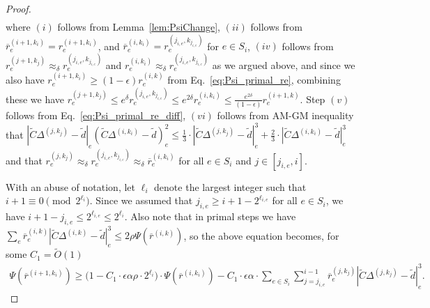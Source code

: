\documentclass[11pt]{article}
\newcommand\dd{\boldsymbol{\mathit{d}}}
\newcommand\rr{\boldsymbol{\mathit{r}}}
\newcommand\rrbar{\overline{\boldsymbol{\mathit{r}}}}
\newcommand\CC{\boldsymbol{\mathit{C}}}
\newcommand{\wt}{\widetilde}
\newcommand{\ov}{\overline}
\begin{document}
\begin{proof}
\begin{align*}
\end{align*}
where $(i)$ follows from Lemma~\ref{lem:PsiChange}, $(ii)$ follows from $\ov{\rr}^{(i+1,k_i)}_e = \rr^{(i+1,k_i)}_e$, and $\ov{\rr}^{(i,k_i)}_e = \rr^{(j_{i,e},k_{j_{i,e}})}_e$ for $e \in S_i$, $(iv)$ follows from $\rr_e^{(j+1,k_j)} \approx_{\delta} \rr_e^{(j_{i,e},k_{j_{i,e}})}$ and $\rr_e^{(i,k_i)} \approx_{\delta} \rr_e^{(j_{i,e},k_{j_{i,e}})}$ as we argued above, and since we also have $\rr_e^{(i+1,k_i)} \geq (1-\epsilon) \rr_e^{(i,k)}$ from Eq.~\eqref{eq:Psi_primal_re}, combining these we have $\rr_e^{(j+1,k_j)} \leq e^{\delta} \rr_e^{(j_{i,e},k_{j_{i,e}})} \leq e^{2\delta} \rr_e^{(i,k_i)} \leq \frac{e^{2\delta}}{(1-\epsilon)} \rr_e^{(i+1,k)}$. Step $(v)$ follows from Eq.~\eqref{eq:Psi_primal_re_diff}, $(vi)$ follows from AM-GM inequality that $|\wt{\CC}\Delta^{(j,k_j)}-\wt{\dd}|_e (\wt{\CC}\Delta^{(i,k_i)}-\wt{\dd})_e^2 \leq \frac{1}{3} \cdot |\wt{\CC}\Delta^{(j,k_j)}-\wt{\dd}|_e^3 + \frac{2}{3} \cdot |\wt{\CC}\Delta^{(i,k_i)}-\wt{\dd}|_e^3$ and that $\rr_e^{(j,k_j)} \approx_{\delta} \rr_e^{(j_{i,e},k_{j_{i,e}})} \approx_{\delta} \ov{\rr}_e^{(i,k_i)}$ for all $e \in S_i$ and $j \in [j_{i,e}, i]$.


With an abuse of notation, let $\ell_i$ denote the largest integer such that $i+1 \equiv 0 \pmod{2^{\ell_i}}$. Since we assumed that $j_{i,e} \geq i+1-2^{\ell_{i,e}}$ for all $e \in S_i$, we have $i+1 - j_{i,e} \leq 2^{\ell_{i,e}} \leq 2^{\ell_i}$. Also note that in primal steps we have $\sum_e \rrbar_e^{(i,k)} |\wt{\CC}\Delta^{(i,k)}-\wt{\dd}|_e^3\leq 2\rho\Psi(\rrbar^{(i,k)})$, so the above equation becomes, for some $C_1 = \wt{O}(1)$
\begin{align}\label{eq:Psi_primal_one_step}
\Psi(\ov{\rr}^{(i+1,k_i)}) \geq \Big( 1 - C_1 \cdot \epsilon \alpha \rho \cdot 2^{\ell_i} \Big) \cdot \Psi(\ov{\rr}^{(i,k_i)}) - C_1 \cdot \epsilon \alpha \cdot \sum_{e \in S_i} \sum_{j=j_{i,e}}^{i-1} \ov{\rr}^{(j,k_j)}_e |\wt{\CC}\Delta^{(j,k_j)}-\wt{\dd}|_e^3.
\end{align}


\end{proof}
\end{document}
